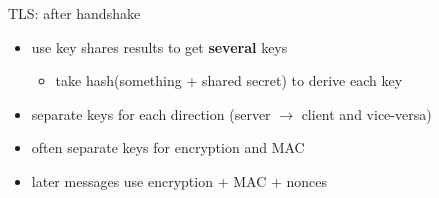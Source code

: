 \begin{frame}{TLS: after handshake}
    \begin{itemize}
    \item use key shares results to get \textbf{several} keys
        \begin{itemize}
        \item take hash(something + shared secret) to derive each key
        \end{itemize}
    \item separate keys for each direction (server $\rightarrow$ client and vice-versa)
    \item often separate keys for encryption and MAC
    \vspace{.5cm}
    \item later messages use encryption + MAC + nonces
    \end{itemize}
\end{frame}
